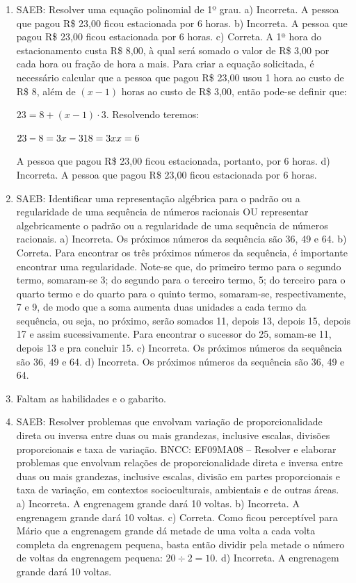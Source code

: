 \begin{enumerate}
\item
SAEB: Resolver uma equação polinomial de 1º grau.
a) Incorreta. A pessoa que pagou R\$ 23,00 ficou estacionada por 6 horas. 
b) Incorreta. A pessoa que pagou R\$ 23,00 ficou estacionada por 6 horas. 
c) Correta. A 1ª hora do estacionamento custa R\$ 8,00, à qual será somado o valor de R\$ 3,00 
por cada hora ou fração de hora a mais. Para criar a equação solicitada, é
necessário calcular que a pessoa que pagou R\$ 23,00 usou 1 hora ao custo de R\$ 8, 
além de $(x - 1)$ horas ao custo de R\$ 3,00, então pode-se definir que:

$23 = 8 + (x - 1) \cdot 3$. Resolvendo teremos:

$23 - 8 = 3x - 3 \\ 
18 = 3x \\ 
x = 6$

A pessoa que pagou R\$ 23,00 ficou estacionada, portanto, por 6 horas.
d) Incorreta. A pessoa que pagou R\$ 23,00 ficou estacionada por 6 horas.

\item
SAEB: Identificar uma representação algébrica para o padrão ou
a regularidade de uma sequência de números racionais OU representar
algebricamente o padrão ou a regularidade de uma sequência de números
racionais.
a) Incorreta. Os próximos números da sequência são 36, 49 e 64.
b) Correta. Para encontrar os três próximos números da sequência, é importante
encontrar uma regularidade. Note-se que, do primeiro termo
para o segundo termo, somaram-se 3; do segundo para o terceiro termo, 5; 
do terceiro para o quarto termo e do quarto para o quinto
termo, somaram-se, respectivamente, 7 e 9, de modo que a soma aumenta duas
unidades a cada termo da sequência, ou seja, no próximo, serão somados 11,
depois 13, depois 15, depois 17 e assim sucessivamente. Para encontrar o
sucessor do 25, somam-se 11, depois 13 e pra concluir 15.
c) Incorreta. Os próximos números da sequência são 36, 49 e 64.
d) Incorreta. Os próximos números da sequência são 36, 49 e 64.

\item
Faltam as habilidades e o gabarito.

\item
SAEB: Resolver problemas que envolvam variação de
proporcionalidade direta ou inversa entre duas ou mais grandezas,
inclusive escalas, divisões proporcionais e taxa de variação.
BNCC: EF09MA08 -- Resolver e elaborar problemas que envolvam relações de
proporcionalidade direta e inversa entre duas ou mais grandezas,
inclusive escalas, divisão em partes proporcionais e taxa de variação,
em contextos socioculturais, ambientais e de outras áreas.
a) Incorreta. A engrenagem grande dará 10 voltas.
b) Incorreta. A engrenagem grande dará 10 voltas.
c) Correta. Como ficou perceptível para Mário que a engrenagem grande dá metade de uma
volta a cada volta completa da engrenagem pequena, basta então dividir pela
metade o número de voltas da engrenagem pequena: $20 \div 2 = 10$.
d) Incorreta. A engrenagem grande dará 10 voltas.


\end{enumerate}

